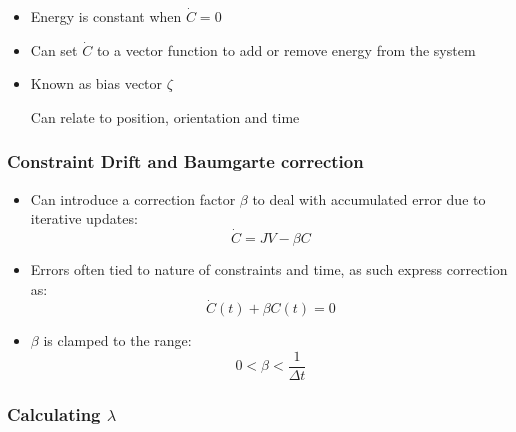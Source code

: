 \documentclass[a4paper]{article}
\begin{document}
\begin{itemize}
  \item
    Energy is constant when $\dot C = 0$

  \item
    Can set $\dot C$ to a vector function to add or remove energy from the
    system

  \item
    Known as bias vector $\zeta$

    Can relate to position, orientation and time

\end{itemize}

\subsubsection{Constraint Drift and Baumgarte correction}

\begin{itemize}
  \item
    Can introduce a correction factor $\beta$ to deal with accumulated error due
    to iterative updates:
    \[
      \dot C = J V - \beta C
    \]

  \item
    Errors often tied to nature of constraints and time, as such express
    correction as:
    \[
      \dot C(t) + \beta C(t) = 0
    \]

  \item
    $\beta$ is clamped to the range:
    \[
      0 < \beta < \frac{1}{\Delta t}
    \]

\end{itemize}

\subsubsection{Calculating $\lambda$}
\end{document}
